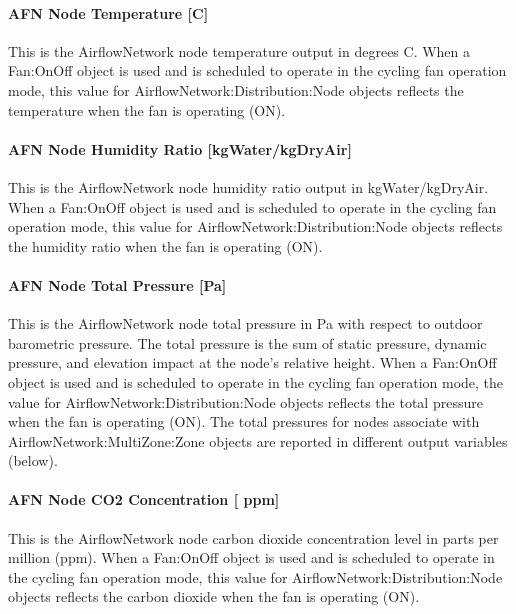 \paragraph{AFN Node Temperature {[}C{]}}\label{afn-node-temperature-c}

This is the AirflowNetwork node temperature output in degrees C. When a Fan:OnOff object is used and is scheduled to operate in the cycling fan operation mode, this value for AirflowNetwork:Distribution:Node objects reflects the temperature when the fan is operating (ON).

\paragraph{AFN Node Humidity Ratio {[}kgWater/kgDryAir{]}}\label{afn-node-humidity-ratio-kgwaterkgdryair}

This is the AirflowNetwork node humidity ratio output in kgWater/kgDryAir. When a Fan:OnOff object is used and is scheduled to operate in the cycling fan operation mode, this value for AirflowNetwork:Distribution:Node objects reflects the humidity ratio when the fan is operating (ON).

\paragraph{AFN Node Total Pressure {[}Pa{]}}\label{afn-node-total-pressure-pa}

This is the AirflowNetwork node total pressure in Pa with respect to outdoor barometric pressure. The total pressure is the sum of static pressure, dynamic pressure, and elevation impact at the node's relative height. When a Fan:OnOff object is used and is scheduled to operate in the cycling fan operation mode, the value for AirflowNetwork:Distribution:Node objects reflects the total pressure when the fan is operating (ON). The total pressures for nodes associate with AirflowNetwork:MultiZone:Zone objects are reported in different output variables (below).

\paragraph{AFN Node CO2 Concentration {[} ppm{]}}\label{afn-node-co2-concentration-ppm}

This is the AirflowNetwork node carbon dioxide concentration level in parts per million (ppm). When a Fan:OnOff object is used and is scheduled to operate in the cycling fan operation mode, this value for AirflowNetwork:Distribution:Node objects reflects the carbon dioxide when the fan is operating (ON).

